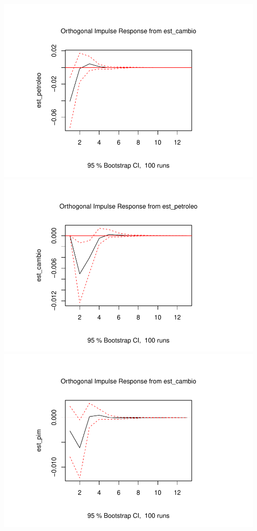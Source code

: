 \documentclass[12pt]{article}
\begin{document}
\includegraphics{teste_en_files/figure-latex/unnamed-chunk-14-7.pdf}
\includegraphics{teste_en_files/figure-latex/unnamed-chunk-14-8.pdf}
\includegraphics{teste_en_files/figure-latex/unnamed-chunk-14-9.pdf}
\end{document}
